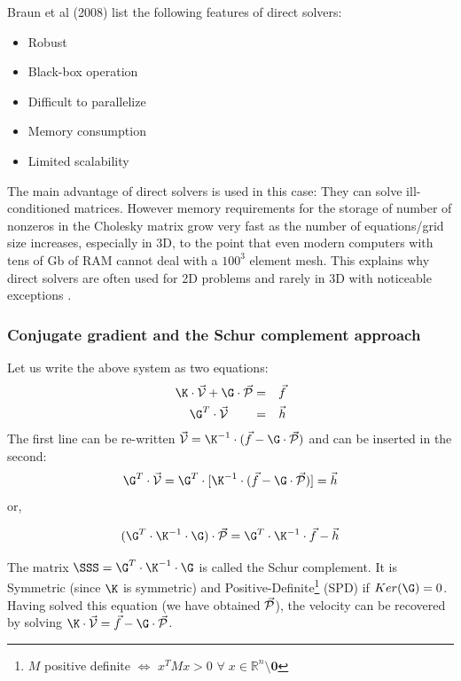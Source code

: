Braun et al (2008) \cite{brtf08} list the following features of direct solvers:
\begin{itemize}
\item Robust
\item Black-box operation
\item Difficult to parallelize
\item Memory consumption
\item Limited scalability
\end{itemize}

The main advantage of direct solvers is used in this case: They can solve ill-conditioned 
matrices. However memory requirements for the storage of number of nonzeros in the 
Cholesky matrix grow very fast as the number of equations/grid size increases, especially in 3D,
to the point that even modern computers with tens of Gb of RAM cannot deal with a $100^3$ element mesh.
This explains why direct solvers are often used for 2D problems and rarely in 3D with noticeable 
exceptions \cite{thfb08,yahb09,brya10,lobh10,alht11,alht12,alhf13,whbb14,neew18}. 

\subsubsection{Conjugate gradient and the Schur complement approach }


Let us write the above system as two equations:
\begin{eqnarray}
\K \cdot \vec{\cal V} + \G \cdot \vec{\cal P} &=& \vec{f} \\
\G^T \cdot  \vec{\cal V} \quad\quad &=& \vec{h} 
\end{eqnarray}
The first line can be re-written $\vec{\cal V}=\K^{-1}\cdot (\vec{f} - \G \cdot \vec{\cal P})$ and can be inserted in the second:
\begin{equation}
\G^T\cdot \vec{\cal V} =\G^T \cdot  [ \K^{-1} \cdot  (\vec{f} - \G \cdot  \vec{\cal P}) ] = \vec{h} 
\end{equation}
or, 
\begin{mdframed}[backgroundcolor=blue!5]
\begin{equation}
(\G^T \cdot \K^{-1} \cdot \G) \cdot \vec{\cal P} = \G^T \cdot \K^{-1}\cdot \vec{f} - \vec{h} 
\end{equation}
\end{mdframed}
The matrix $\SSS= \G^T \cdot \K^{-1} \cdot \G $ is called the Schur complement. 
It is Symmetric (since $\K$ is symmetric) and  Positive-Definite\footnote{$M$ 
positive definite $\iff$ $x^TMx>0$ $\forall \; x\in \mathbb{R}^n \setminus {\bm 0}$ }
(SPD)  if $Ker({\G})=0$. 
Having solved this equation (we have obtained $\vec{\cal P}$), the velocity can be recovered by solving 
$\K\cdot \vec{\cal V} =\vec{f}- \G \cdot \vec{\cal P}$. 

